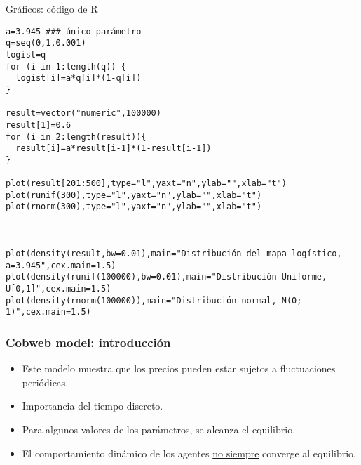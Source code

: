 \documentclass[11pt]{beamer}
\begin{document}
\begin{frame}[fragile]{Gráficos: código de R}
\begin{verbatim}        
a=3.945 ### único parámetro
q=seq(0,1,0.001)
logist=q
for (i in 1:length(q)) {
  logist[i]=a*q[i]*(1-q[i])  
}

result=vector("numeric",100000)
result[1]=0.6    
for (i in 2:length(result)){
  result[i]=a*result[i-1]*(1-result[i-1])
}

plot(result[201:500],type="l",yaxt="n",ylab="",xlab="t")
plot(runif(300),type="l",yaxt="n",ylab="",xlab="t")
plot(rnorm(300),type="l",yaxt="n",ylab="",xlab="t")



plot(density(result,bw=0.01),main="Distribución del mapa logístico, a=3.945",cex.main=1.5)
plot(density(runif(100000),bw=0.01),main="Distribución Uniforme, U[0,1]",cex.main=1.5)
plot(density(rnorm(100000)),main="Distribución normal, N(0; 1)",cex.main=1.5)
    \end{verbatim}
\end{frame}

\begin{frame}
\frametitle{Cobweb model: introducción}
\begin{itemize}
	\item Este modelo muestra que los precios pueden estar sujetos a fluctuaciones periódicas.
	\item Importancia del tiempo discreto.
	\item Para algunos valores de los parámetros, se alcanza el equilibrio.
	\item El comportamiento dinámico de los agentes \underline{no siempre} converge al equilibrio.
\end{itemize}
\end{frame}
\end{document}
